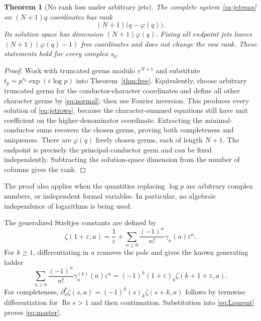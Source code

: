 \documentclass[11pt]{article}
\numberwithin{equation}{section}
\newtheorem{theorem}{Theorem}[section]
\theoremstyle{definition}\newtheorem{definition}[theorem]{Definition}
\theoremstyle{remark}\newtheorem{remark}[theorem]{Remark}
\DeclareMathOperator{\Rea}{Re}
\newcommand{\eps}{\varepsilon}
\begin{document}
\begin{theorem}[No rank loss under arbitrary jets]\label{thm:jets}
The complete system \eqref{eq:jetrows} on $(N+1)q$ coordinates has rank
\begin{equation}\label{eq:jetrank}
(N+1)\bigl(q-\varphi(q)\bigr).
\end{equation}
Its solution space has dimension $(N+1)\varphi(q)$. Fixing all endpoint
jets leaves $(N+1)(\varphi(q)-1)$ free coordinates and does not change
the row rank. These statements hold for every complex $s_0$.
\end{theorem}
\begin{proof}
Work with truncated germs modulo $\eps^{N+1}$ and substitute
$t_p=p^{s_0}\exp(\eps\log p)$ into Theorem~\ref{thm:free}.
Equivalently, choose arbitrary truncated germs for the conductor-character
coordinates and define all other character germs by
\eqref{eq:normal}; then use Fourier inversion. This produces every solution
of \eqref{eq:jetrows}, because the character-summed equations still have
unit coefficient on the higher-denominator coordinate. Extracting the
minimal-conductor sums recovers the chosen germs, proving both completeness
and uniqueness. There are $\varphi(q)$ freely chosen germs, each of length
$N+1$. The endpoint is precisely the principal-conductor germ and can be
fixed independently. Subtracting the solution-space dimension from the
number of columns gives the rank.
\end{proof}

The proof also applies when the quantities replacing $\log p$ are arbitrary
complex numbers, or independent formal variables. In particular, no
algebraic independence of logarithms is being used.

The generalized Stieltjes constants are defined by
\begin{equation}\label{eq:Laurent}
\zeta(1+\eps,a)=\frac1\eps+
\sum_{n\ge0}\frac{(-1)^n}{n!}\gamma_n(a)\eps^n.
\end{equation}
For $k\ge1$, differentiating in $a$ removes the pole and gives the
known generating ladder
\begin{equation}\label{eq:master}
\sum_{n\ge0}\frac{(-1)^n}{n!}\gamma_n^{(k)}(a)\eps^n
=(-1)^k(1+\eps)_k\zeta(k+1+\eps,a).
\end{equation}
For completeness, $\partial_a^k\zeta(s,a)=(-1)^k(s)_k\zeta(s+k,a)$
follows by termwise differentiation for $\Rea s>1$ and then continuation.
Substitution into \eqref{eq:Laurent} proves \eqref{eq:master}.
\end{document}
